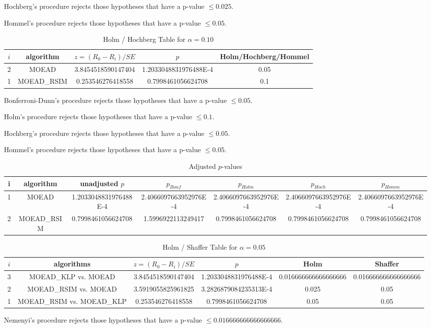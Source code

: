 \documentclass[a4paper,10pt]{article}
\begin{document}
\begin{landscape}
Hochberg's procedure rejects those hypotheses that have a p-value $\le0.025$.


Hommel's procedure rejects those hypotheses that have a p-value $\le0.05$.


\begin{table}[!htp]
\centering\tiny
\caption{Holm / Hochberg Table for $\alpha=0.10$}
\begin{tabular}{ccccc}
$i$&algorithm&$z=(R_0 - R_i)/SE$&$p$&Holm/Hochberg/Hommel\\
\hline
2&MOEAD&3.8454518590147404&1.2033048831976488E-4&0.05\\
1&MOEAD_RSIM&0.253546276418558&0.7998461056624708&0.1\\
\hline
\end{tabular}
\end{table}
Bonferroni-Dunn's procedure rejects those hypotheses that have a p-value $\le0.05$.


Holm's procedure rejects those hypotheses that have a p-value $\le0.1$.


Hochberg's procedure rejects those hypotheses that have a p-value $\le0.05$.


Hommel's procedure rejects those hypotheses that have a p-value $\le0.05$.


\begin{table}[!htp]
\centering\tiny
\caption{Adjusted $p$-values}
\begin{tabular}{ccccccc}
i&algorithm&unadjusted $p$&$p_{Bonf}$&$p_{Holm}$&$p_{Hoch}$&$p_{Homm}$\\
\hline
1&MOEAD&1.2033048831976488E-4&2.4066097663952976E-4&2.4066097663952976E-4&2.4066097663952976E-4&2.4066097663952976E-4\\
2&MOEAD_RSIM&0.7998461056624708&1.5996922113249417&0.7998461056624708&0.7998461056624708&0.7998461056624708\\
\hline
\end{tabular}
\end{table}

\begin{table}[!htp]
\centering\tiny
\caption{Holm / Shaffer Table for $\alpha=0.05$}
\begin{tabular}{cccccc}
$i$&algorithms&$z=(R_0 - R_i)/SE$&$p$&Holm&Shaffer\\
\hline
3&MOEAD_KLP vs. MOEAD&3.8454518590147404&1.2033048831976488E-4&0.016666666666666666&0.016666666666666666\\
2&MOEAD_RSIM vs. MOEAD&3.5919055825961825&3.2826879084235313E-4&0.025&0.05\\
1&MOEAD_RSIM vs. MOEAD_KLP&0.253546276418558&0.7998461056624708&0.05&0.05\\
\hline
\end{tabular}
\end{table}
Nemenyi's procedure rejects those hypotheses that have a p-value $\le0.016666666666666666$.



\end{landscape}
\end{document}
